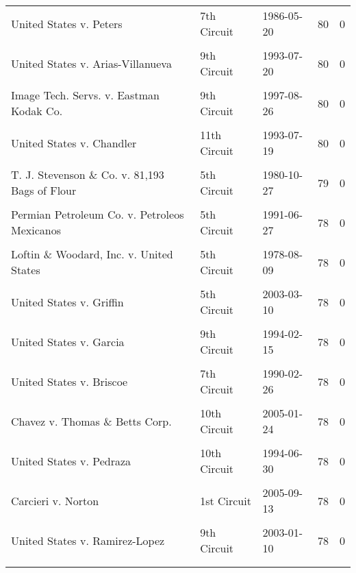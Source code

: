\documentclass[10pt, letterpaper]{article}
\begin{document}
\begin{spacing}{1.0}
\begin{footnotesize}
\begin{longtable}[H]{p{3.5in}llrr}
        United States v. Peters & 7th Circuit & 1986-05-20 & 80 & 0\\
        & & & &\\[-6pt]
        United States v. Arias-Villanueva & 9th Circuit & 1993-07-20 & 80 & 0\\
        & & & &\\[-6pt]
        Image Tech. Servs. v. Eastman Kodak Co. & 9th Circuit & 1997-08-26 & 80 & 0\\
        & & & &\\[-6pt]
        United States v. Chandler & 11th Circuit & 1993-07-19 & 80 & 0\\
        & & & &\\[-6pt]
        T. J. Stevenson \& Co. v. 81,193 Bags of Flour & 5th Circuit & 1980-10-27 & 79 & 0\\
        & & & &\\[-6pt]
        Permian Petroleum Co. v. Petroleos Mexicanos & 5th Circuit & 1991-06-27 & 78 & 0\\
        & & & &\\[-6pt]
        Loftin \& Woodard, Inc. v. United States & 5th Circuit & 1978-08-09 & 78 & 0\\
        & & & &\\[-6pt]
        United States v. Griffin & 5th Circuit & 2003-03-10 & 78 & 0\\
        & & & &\\[-6pt]
        United States v. Garcia & 9th Circuit & 1994-02-15 & 78 & 0\\
        & & & &\\[-6pt]
        United States v. Briscoe & 7th Circuit & 1990-02-26 & 78 & 0\\
        & & & &\\[-6pt]
        Chavez v. Thomas \& Betts Corp. & 10th Circuit & 2005-01-24 & 78 & 0\\
        & & & &\\[-6pt]
        United States v. Pedraza & 10th Circuit & 1994-06-30 & 78 & 0\\
        & & & &\\[-6pt]
        Carcieri v. Norton & 1st Circuit & 2005-09-13 & 78 & 0\\
        & & & &\\[-6pt]
        United States v. Ramirez-Lopez & 9th Circuit & 2003-01-10 & 78 & 0\\
        \hline\\[-6pt]
        \label{tab:topDiffLegalTopicsAssigned}
    \end{longtable}
\end{footnotesize}


\end{spacing}
\end{document}
